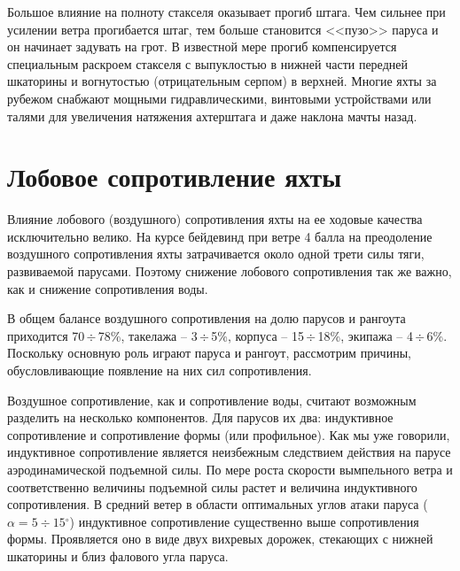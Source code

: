 \documentclass[a4paper, 12pt, twoside, final, book, russian, fittopage, cyremdash]{ncc}
\newcommand{\gr}{\ensuremath{^\circ}\xspace}
\newcommand{\otdo}{\,\ensuremath{\div}\,}
\newcommand{\motdo}{\div}
\begin{document}
Большое влияние на полноту стакселя оказывает прогиб штага. Чем сильнее при усилении ветра прогибается штаг, тем больше становится <<пузо>> паруса и он начинает задувать на грот. В известной мере прогиб компенсируется специальным раскроем стакселя с выпуклостью в нижней части передней шкаторины и вогнутостью (отрицательным серпом) в верхней. Многие яхты за рубежом снабжают мощными гидравлическими, винтовыми устройствами или талями для увеличения натяжения ахтерштага и даже наклона мачты назад.

\section{Лобовое сопротивление яхты}

Влияние лобового (воздушного) сопротивления яхты на ее ходовые качества исключительно велико. На курсе бейдевинд при ветре 4 балла на преодоление воздушного сопротивления яхты затрачивается около одной трети силы тяги, развиваемой парусами. Поэтому снижение лобового сопротивления так же важно, как и снижение сопротивления воды.

В общем балансе воздушного сопротивления на долю парусов и рангоута приходится 70\otdo 78\%, такелажа \--- 3\otdo 5\%, корпуса \--- 15\otdo 18\%, экипажа \--- 4\otdo 6\%. Поскольку основную роль играют паруса и рангоут, рассмотрим причины, обусловливающие появление на них сил сопротивления.

Воздушное сопротивление, как и сопротивление воды, считают возможным разделить на несколько компонентов. Для парусов их два: индуктивное сопротивление и сопротивление формы (или профильное). Как мы уже говорили, индуктивное сопротивление является неизбежным следствием действия на парусе аэродинамической подъемной силы. По мере роста скорости вымпельного ветра и соответственно величины подъемной силы растет и величина индуктивного сопротивления. В средний ветер в области оптимальных углов атаки паруса ($\alpha = 5\motdo 15\gr$) индуктивное сопротивление существенно выше сопротивления формы. Проявляется оно в виде двух вихревых дорожек, стекающих с нижней шкаторины и близ фалового угла паруса.
 
\end{document}
